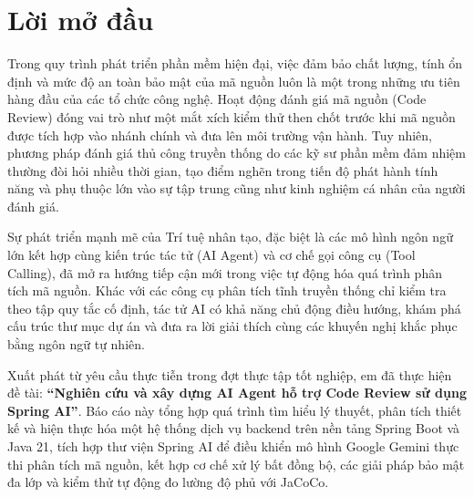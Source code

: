 \documentclass[12pt,a4paper]{report}
\begin{document}

\chapter*{Lời mở đầu}

Trong quy trình phát triển phần mềm hiện đại, việc đảm bảo chất lượng, tính ổn định và mức độ an toàn bảo mật của mã nguồn luôn là một trong những ưu tiên hàng đầu của các tổ chức công nghệ. Hoạt động đánh giá mã nguồn (Code Review) đóng vai trò như một mắt xích kiểm thử then chốt trước khi mã nguồn được tích hợp vào nhánh chính và đưa lên môi trường vận hành. Tuy nhiên, phương pháp đánh giá thủ công truyền thống do các kỹ sư phần mềm đảm nhiệm thường đòi hỏi nhiều thời gian, tạo điểm nghẽn trong tiến độ phát hành tính năng và phụ thuộc lớn vào sự tập trung cũng như kinh nghiệm cá nhân của người đánh giá.

Sự phát triển mạnh mẽ của Trí tuệ nhân tạo, đặc biệt là các mô hình ngôn ngữ lớn kết hợp cùng kiến trúc tác tử (AI Agent) và cơ chế gọi công cụ (Tool Calling), đã mở ra hướng tiếp cận mới trong việc tự động hóa quá trình phân tích mã nguồn. Khác với các công cụ phân tích tĩnh truyền thống chỉ kiểm tra theo tập quy tắc cố định, tác tử AI có khả năng chủ động điều hướng, khám phá cấu trúc thư mục dự án và đưa ra lời giải thích cùng các khuyến nghị khắc phục bằng ngôn ngữ tự nhiên.

Xuất phát từ yêu cầu thực tiễn trong đợt thực tập tốt nghiệp, em đã thực hiện đề tài: \textbf{``Nghiên cứu và xây dựng AI Agent hỗ trợ Code Review sử dụng Spring AI''}. Báo cáo này tổng hợp quá trình tìm hiểu lý thuyết, phân tích thiết kế và hiện thực hóa một hệ thống dịch vụ backend trên nền tảng Spring Boot và Java 21, tích hợp thư viện Spring AI để điều khiển mô hình Google Gemini thực thi phân tích mã nguồn, kết hợp cơ chế xử lý bất đồng bộ, các giải pháp bảo mật đa lớp và kiểm thử tự động đo lường độ phủ với JaCoCo.
\end{document}
